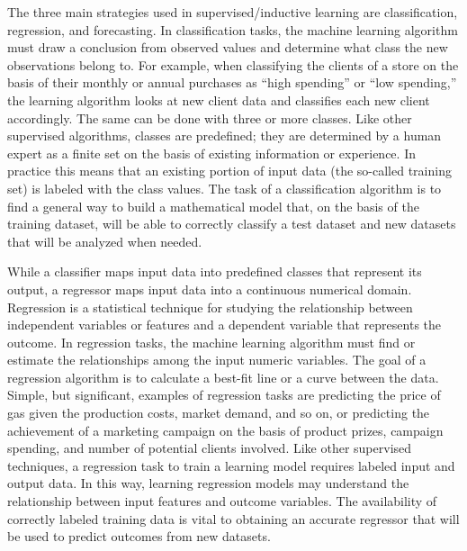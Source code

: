The three main strategies used in supervised/inductive learning are classification, regression, and forecasting. In classification tasks, the machine learning algorithm must draw a conclusion from observed values and determine what class the new observations belong to. For example, when classifying the clients of a store on the basis of their monthly or annual purchases as ``high spending'' or ``low \hbox{spending,''} the learning algorithm looks at new client data and classifies each new client accordingly. The same can be done with three or more classes. Like other supervised algorithms, classes are predefined; they are determined by a human expert as a finite set on the basis of existing information\vadjust{\vspace*{12pt}\pagebreak} or experience. In \hbox{practice} this means that an existing portion of input data (the so-called training set) is labeled with the class values. The task of a classification algorithm is to find a general way to build a mathematical model that, on the basis of the training dataset, will be able to correctly classify a test dataset and new datasets that will be analyzed when needed.

While a classifier maps input data into predefined classes that represent its output, a regressor maps input data into a continuous numerical domain. Regression is a statistical technique for studying the relationship between independent variables or features and a dependent variable that represents the outcome. In regression tasks, the machine learning algorithm must find or estimate the relationships among the input numeric variables. The goal of a regression algorithm is to calculate a best-fit line or a curve between the data. Simple, but significant, examples of regression tasks are predicting the price of gas given the production costs, market demand, and so on, or predicting the achievement of a marketing campaign on the basis of product prizes, campaign spending, and number of potential clients involved. Like other supervised techniques, a regression task to train a learning model requires labeled input and output data. In this way, learning regression models may understand the relationship between input features and outcome variables. The availability of correctly labeled training data is vital to obtaining an accurate regressor that will be used to predict outcomes from new datasets.

